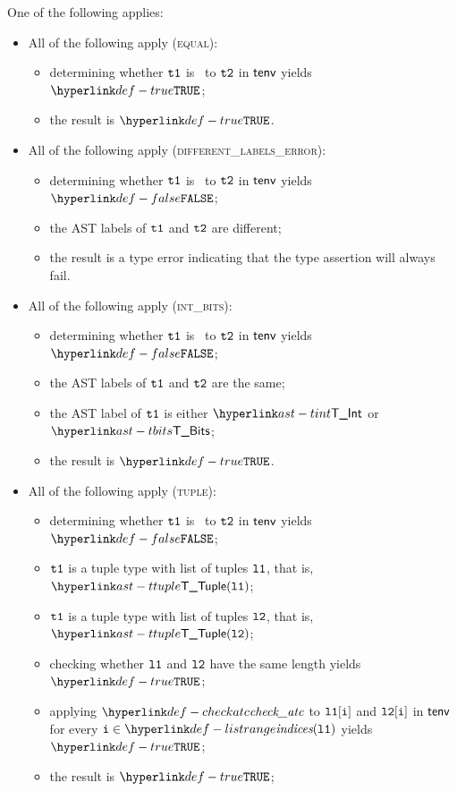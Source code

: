 \ProseParagraph
One of the following applies:
\begin{itemize}
  \item All of the following apply (\textsc{equal}):
  \begin{itemize}
    \item determining whether $\texttt{t1}$ is \typeequivalent\ to $\texttt{t2}$ in $\textsf{tenv}$ yields $\True$\ProseOrTypeError;
    \item the result is $\True$.
  \end{itemize}

  \item All of the following apply (\textsc{different\_labels\_error}):
  \begin{itemize}
    \item determining whether $\texttt{t1}$ is \typeequivalent\ to $\texttt{t2}$ in $\textsf{tenv}$ yields $\False$;
    \item the AST labels of $\texttt{t1}$ and $\texttt{t2}$ are different;
    \item the result is a type error indicating that the type assertion will always fail.
  \end{itemize}

  \item All of the following apply (\textsc{int\_bits}):
  \begin{itemize}
    \item determining whether $\texttt{t1}$ is \typeequivalent\ to $\texttt{t2}$ in $\textsf{tenv}$ yields $\False$;
    \item the AST labels of $\texttt{t1}$ and $\texttt{t2}$ are the same;
    \item the AST label of $\texttt{t1}$ is either $\TInt$ or $\TBits$;
    \item the result is $\True$.
  \end{itemize}

  \item All of the following apply (\textsc{tuple}):
  \begin{itemize}
    \item determining whether $\texttt{t1}$ is \typeequivalent\ to $\texttt{t2}$ in $\textsf{tenv}$ yields $\False$;
    \item $\texttt{t1}$ is a tuple type with list of tuples $\texttt{l1}$, that is, $\TTuple(\vlone)$;
    \item $\texttt{t1}$ is a tuple type with list of tuples $\texttt{l2}$, that is, $\TTuple(\vltwo)$;
    \item checking whether $\texttt{l1}$ and $\texttt{l2}$ have the same length yields $\True$\ProseTerminateAs{\TypeAssertionFailure};
    \item applying $\checkatc$ to $\texttt{l1}[\texttt{i}]$ and $\texttt{l2}[\texttt{i}]$ in $\textsf{tenv}$ for every $\vi\in\listrange(\vlone)$ yields $\True$\ProseOrTypeError;
    \item the result is $\True$;
  \end{itemize}


\end{itemize}

